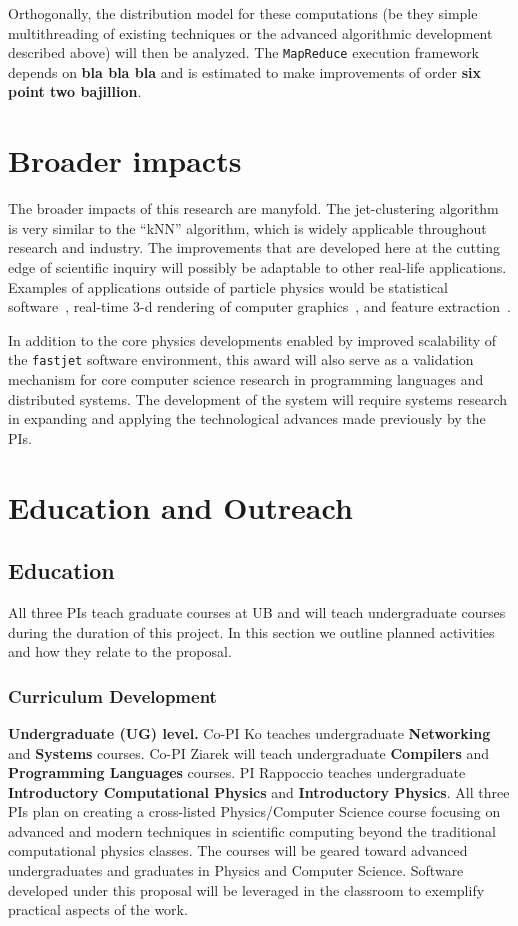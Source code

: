 \documentclass[times,11pt]{article}
\begin{document}
Orthogonally, the distribution model for these computations (be they
simple multithreading of existing techniques or the advanced
algorithmic development described above) will then be analyzed. The
{\tt MapReduce} execution framework depends on {\bf bla bla bla} and
is estimated to make improvements of order {\bf six point two
  bajillion}. 

\section{Broader impacts}

The broader impacts of this research are manyfold. The jet-clustering
algorithm is very similar to the ``kNN'' algorithm, which is widely
applicable throughout research and industry. The improvements that are
developed here at the cutting edge of scientific inquiry will possibly be
adaptable to other real-life applications. Examples of applications
outside of particle physics would be statistical
software~\cite{statsoft}, real-time 3-d rendering of computer
graphics~\cite{opengl}, and feature extraction~\cite{featureextract}. 

In addition to the core physics developments enabled by improved
scalability of the {\tt fastjet} software environment, this award will
also serve as a validation mechanism for core computer science
research in programming languages and distributed systems.  The development
of the system will require systems research in expanding and applying
the technological advances made previously by the PIs.



\section{Education and Outreach}


\subsection{Education}
All three PIs teach graduate courses at UB and will teach undergraduate courses
during the duration of this project.  In this section we outline planned activities
and how they relate to the proposal.


\subsubsection{Curriculum Development}

{\bf Undergraduate (UG) level.}
Co-PI Ko teaches undergraduate {\bf Networking} and {\bf Systems} courses. Co-PI Ziarek will
teach undergraduate {\bf Compilers} and {\bf Programming Languages}
courses. 
PI Rappoccio teaches undergraduate 
{\bf Introductory Computational Physics} and {\bf Introductory Physics}. 
All three PIs plan on creating a cross-listed Physics/Computer Science course
focusing on advanced and modern techniques in scientific computing
beyond the traditional computational physics classes. The courses will be geared toward
advanced undergraduates and graduates in Physics and Computer Science.
Software developed under this proposal will be leveraged in the
classroom to exemplify practical aspects of the work.
\end{document}
